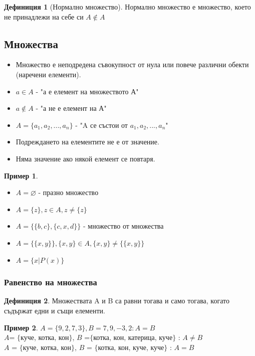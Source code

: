 \documentclass[fleqn, 12pt]{article}
\theoremstyle{definition}
\newtheorem{example}{Пример}[subsection]
\newtheorem{definition}{Дефиниция}[subsection]
\begin{document}
\begin{definition}[Нормално множество]
Нормално множество е множество, което не принадлежи на себе си $A \notin A$
\end{definition}

\subsection{Множества}
\begin{itemize}
	\item Множество е неподредена съвокупност от нула или повече различни обекти (наречени елементи). 
 	\item $a \in A$ - "а е елемент на множеството А" 
	\item $a \notin A$ - "а не е елемент на А"
	\item $A = \{ a_1, a_2, ..., a_n\}$ - "A се състои от $a_1, a_2, ..., a_n$"
	\item Подреждането на елементите не е от значение.
	\item Няма значение ако някой елемент се повтаря. 
\end{itemize}

\begin{example}

\begin{itemize}
	\item $A = \varnothing$ - празно множество 
	\item $A = \{z\}, z \in A, z \neq \{z\}$
	\item $A =\{ \{b,c \}, \{c, x, d \} \}$ - множество от множества 
	\item $A = \{\{ x, y \}\}, \{x,y\} \in A, \{x,y\} \neq \{\{x,y\}\}$
	\item $A = \{x | P(x) \}$
\end{itemize}

\end{example}

\subsubsection{Равенство на множества}

\begin{definition}
Множествата A и B са равни тогава и само тогава, когато съдържат едни и същи елементи.
\end{definition}

\begin{example}
$A = \{9, 2, 7, 3\}, B = {7, 9, -3, 2} : A = B$\\
$A$= $\{$куче, котка, кон$\}$, $B$ =$\{$котка, кон, катерица, куче$\}$ : $A\neq B$ \\
$A$ = $\{$куче, котка, кон$\}$, $B$ = $\{$котка, кон, куче, куче$\}$  : $A = B$
\end{example}
\end{document}
